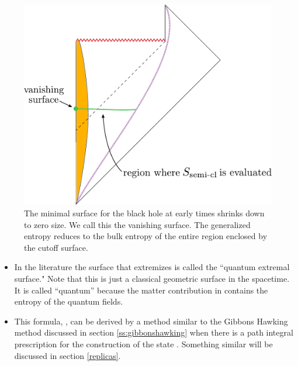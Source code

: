 	\begin{figure}[t]
\begin{center}
\includegraphics[scale=0.4]{figures/collapse-RT.pdf}
\caption{  \small The minimal surface for the black hole at early times shrinks down to zero size. We call this the vanishing surface. The generalized entropy reduces to the bulk entropy of the entire region enclosed by the cutoff surface. \label{CollapseRT}}

\end{center}
\end{figure}


\begin{itemize}
		
	\item
In the literature the surface that extremizes  is called the ``quantum extremal surface." 
Note that this is just a classical geometric surface in the spacetime. It is called ``quantum'' because the matter  contribution in  contains the entropy of the quantum fields. 
\item
	 This formula, ,  can be derived by a method similar to the Gibbons Hawking method discussed in section \ref{ss:gibbonshawking} when there is a path integral prescription for the construction of the state  \cite{Lewkowycz:2013nqa,Faulkner:2013ana,Dong:2017xht}.
	 Something similar will be discussed in section \ref{replicas}.
	
	\end{itemize}



